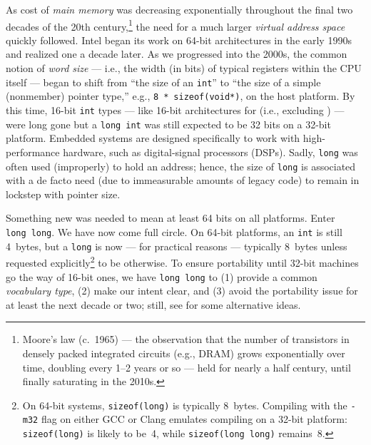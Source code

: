 \noindent As cost of \emph{main memory} was decreasing exponentially
throughout the final two decades of the 20th
century,{\cprotect\footnote{Moore's law (c.~1965) --- the observation
that the number of transistors in densely packed integrated circuits
(e.g., DRAM) grows exponentially over time, doubling every 1--2 years
or so --- held for nearly a half century, until finally saturating in
  the 2010s.}} the need for a much larger \emph{virtual address space}
quickly followed. Intel began its work on 64-bit architectures in the
early 1990s and realized one a decade later. As we progressed into
the 2000s, the common notion of \emph{word size} --- i.e., the width (in
bits) of typical registers within the CPU itself --- began to shift from
``the size of an \lstinline!int!'' to ``the size of a simple (nonmember)
pointer type,'' e.g., \lstinline!8!~\lstinline!*!~\lstinline!sizeof(void*)!, on the host platform. By this time, 16-bit \lstinline!int! types --- like 16-bit architectures for  (i.e., excluding ) --- were long gone but a \lstinline!long!~\lstinline!int! was still expected to be 32 bits on a 32-bit platform. Embedded systems are designed specifically to work with high-performance hardware, such as digital-signal processors (DSPs). Sadly,
\lstinline!long! was often used (improperly) to hold an address; hence,
the size of \lstinline!long! is associated with a de facto need (due to immeasurable amounts of legacy code) to remain in lockstep with pointer size.

Something new was needed to mean at least 64 bits on all platforms.
Enter \lstinline!long!~\lstinline!long!. We have now come full circle. On
64-bit platforms, an \lstinline!int! is still 4~bytes, but a \lstinline!long!
is now --- for practical reasons --- typically 8~bytes unless requested
explicitly{\cprotect\footnote{On 64-bit systems, \lstinline!sizeof(long)!
is typically 8~bytes. Compiling with the \lstinline!-m32! flag on either
GCC or Clang emulates compiling on a 32-bit platform:
\lstinline!sizeof(long)! is likely to be~4, while
  \lstinline!sizeof(long!~\lstinline!long)! remains~8.}} to be otherwise. To ensure portability until 32-bit machines go the way of 16-bit ones,
we have \lstinline!long!~\lstinline!long! to (1) provide a common \emph{vocabulary type}, (2)
make our intent clear, and (3) avoid the portability issue for
at least the next decade or two; still, see  
for some alternative ideas.



